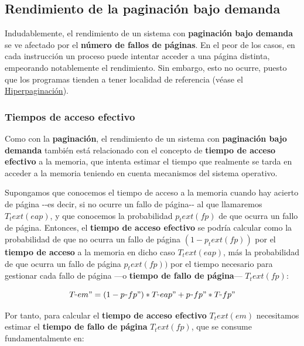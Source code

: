 \subsection{Rendimiento de la paginación bajo
demanda}\label{_rendimiento_de_la_paginaciuxf3n_bajo_demanda}

Indudablemente, el rendimiento de un sistema con \textbf{paginación bajo
demanda} se ve afectado por el \textbf{número de fallos de páginas}. En
el peor de los casos, en cada instrucción un proceso puede intentar
acceder a una página distinta, empeorando notablemente el rendimiento.
Sin embargo, esto no ocurre, puesto que los programas tienden a tener
localidad de referencia (véase el
\hyperref[_hiperpaginaciuxf3n]{Hiperpaginación}).

\subsubsection{Tiempos de acceso
efectivo}\label{_tiempos_de_acceso_efectivo}

Como con la \textbf{paginación}, el rendimiento de un sistema con
\textbf{paginación bajo demanda} también está relacionado con el
concepto de \textbf{tiempo de acceso efectivo}{} a la memoria, que
intenta estimar el tiempo que realmente se tarda en acceder a la memoria
teniendo en cuenta mecanismos del sistema operativo.

Supongamos que conocemos el tiempo de acceso a la memoria cuando hay
acierto de página -\/-es decir, si no ocurre un fallo de página-\/- al
que llamaremos \(T_text(eap)\), y que conocemos la probabilidad
\(p_text(fp)\) de que ocurra un fallo de página. Entonces, el
\textbf{tiempo de acceso efectivo} se podría calcular como la
probabilidad de que no ocurra un fallo de página \((1 - p_text(fp))\)
por el \textbf{tiempo de acceso} a la memoria en dicho caso
\(T_text(eap)\), más la probabilidad de que ocurra un fallo de página
\(p_text(fp))\) por el tiempo necesario para gestionar cada fallo de
página ---o \textbf{tiempo de fallo de página}{}--- \(T_text(fp)\):

\[T_"em" = (1-p_"fp")*T_"eap" + p_"fp"*T_"fp"\]

Por tanto, para calcular el \textbf{tiempo de acceso efectivo}
\(T_text(em)\) necesitamos estimar el \textbf{tiempo de fallo de página}
\(T_text(fp)\), que se consume fundamentalmente en:

